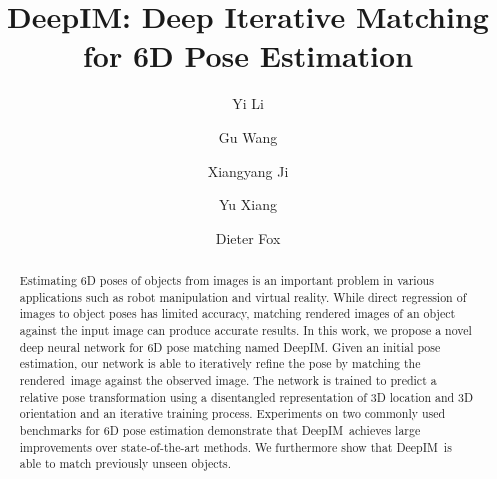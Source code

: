 \documentclass[twocolumn]{svjour3}
\newcommand{\dimnet}[0]{DeepIM}
\newcommand{\rend}[0]{rendered}
\begin{document}

\title{DeepIM: Deep Iterative Matching for 6D Pose Estimation} %


\author{Yi Li \and Gu Wang \and Xiangyang Ji \and Yu Xiang \and Dieter Fox}

\maketitle

\begin{abstract}

Estimating 6D poses of objects from images is an important problem in various applications such as robot manipulation and virtual reality. While direct regression of images to object poses has limited accuracy, matching rendered images of an object against the input image can produce accurate results. In this work, we propose a novel deep neural network for 6D pose matching named \dimnet. Given an initial pose estimation, our network is able to iteratively refine the pose by matching the \rend\ image against the observed image. The network is trained to predict a relative pose transformation using a disentangled representation of 3D location and 3D orientation and an iterative training process. Experiments on two commonly used benchmarks for 6D pose estimation demonstrate that \dimnet \ achieves large improvements over state-of-the-art methods. We furthermore show that \dimnet\ is able to match previously unseen objects.

\end{abstract}
\end{document}
